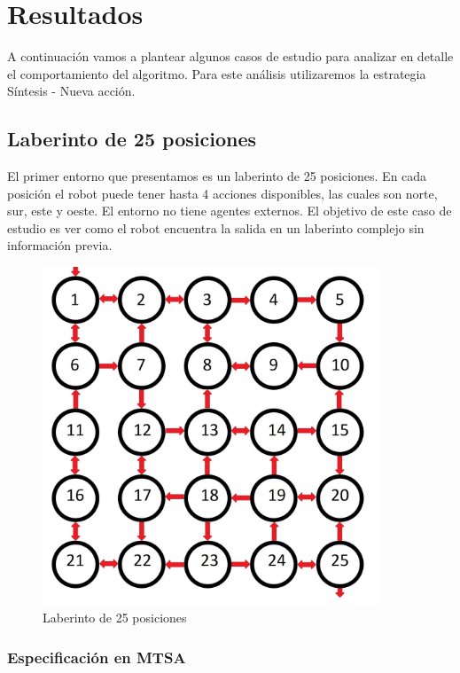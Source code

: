 \chapter{Resultados}

A continuación vamos a plantear algunos casos de estudio para analizar en detalle el comportamiento del algoritmo.
Para este análisis utilizaremos la estrategia Síntesis - Nueva acción.

\section{Laberinto de 25 posiciones}

El primer entorno que presentamos es un laberinto de 25 posiciones. En cada posición el robot puede tener hasta 4
acciones disponibles, las cuales son norte, sur, este y oeste. El entorno no tiene agentes externos. El objetivo de
este caso de estudio es ver como el robot encuentra la salida en un laberinto complejo sin información previa.

\begin{figure}[H]
	\centering
		\includegraphics[width=0.9\textwidth]{Imagenes/Laberintos/25.jpg}
	\caption{Laberinto de 25 posiciones}
	\label{fig:25}
\end{figure}

\subsection{Especificación en MTSA}

